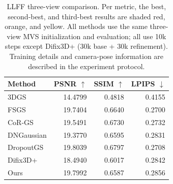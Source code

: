 \begin{table}[t]
\centering
\caption{LLFF three-view comparison. Per metric, the best, second-best, and third-best results are shaded red, orange, and yellow. All methods use the same three-view MVS initialization and evaluation; all use 10k steps except Difix3D+ (30k base + 30k refinement). Training details and camera-pose information are described in the experiment protocol.}
\label{tab:llff_main}
\begin{tabular}{lrrr}
\toprule
Method & PSNR $\uparrow$ & SSIM $\uparrow$ & LPIPS $\downarrow$ \\
\midrule
3DGS & 14.4799 & 0.4818 & 0.4155 \\
FSGS & \cellcolor{rankthird}19.7404 & \cellcolor{rankthird}0.6640 & \cellcolor{rankbest}0.2700 \\
CoR-GS & 19.5491 & \cellcolor{ranksecond}0.6730 & \cellcolor{rankthird}0.2732 \\
DNGaussian & 19.3770 & 0.6595 & 0.2831 \\
DropoutGS & \cellcolor{rankbest}19.8039 & \cellcolor{rankbest}0.6797 & \cellcolor{ranksecond}0.2708 \\
Difix3D+ & 18.4940 & 0.6017 & 0.2842 \\
Ours & \cellcolor{ranksecond}19.7992 & 0.6587 & 0.2856 \\
\bottomrule
\end{tabular}
\end{table}
